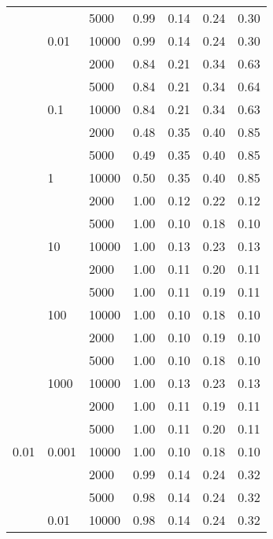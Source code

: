 \begin{tabular}{lllrrrr}
      &       & 5000 &       0.99 &       0.14 &       0.24 &       0.30 \\
      & 0.01 & 10000 &       0.99 &       0.14 &       0.24 &       0.30 \\
      &       & 2000 &       0.84 &       0.21 &       0.34 &       0.63 \\
      &       & 5000 &       0.84 &       0.21 &       0.34 &       0.64 \\
      & 0.1 & 10000 &       0.84 &       0.21 &       0.34 &       0.63 \\
      &       & 2000 &       0.48 &       0.35 &       0.40 &       0.85 \\
      &       & 5000 &       0.49 &       0.35 &       0.40 &       0.85 \\
      & 1 & 10000 &       0.50 &       0.35 &       0.40 &       0.85 \\
      &       & 2000 &       1.00 &       0.12 &       0.22 &       0.12 \\
      &       & 5000 &       1.00 &       0.10 &       0.18 &       0.10 \\
      & 10 & 10000 &       1.00 &       0.13 &       0.23 &       0.13 \\
      &       & 2000 &       1.00 &       0.11 &       0.20 &       0.11 \\
      &       & 5000 &       1.00 &       0.11 &       0.19 &       0.11 \\
      & 100 & 10000 &       1.00 &       0.10 &       0.18 &       0.10 \\
      &       & 2000 &       1.00 &       0.10 &       0.19 &       0.10 \\
      &       & 5000 &       1.00 &       0.10 &       0.18 &       0.10 \\
      & 1000 & 10000 &       1.00 &       0.13 &       0.23 &       0.13 \\
      &       & 2000 &       1.00 &       0.11 &       0.19 &       0.11 \\
      &       & 5000 &       1.00 &       0.11 &       0.20 &       0.11 \\
0.01 & 0.001 & 10000 &       1.00 &       0.10 &       0.18 &       0.10 \\
      &       & 2000 &       0.99 &       0.14 &       0.24 &       0.32 \\
      &       & 5000 &       0.98 &       0.14 &       0.24 &       0.32 \\
      & 0.01 & 10000 &       0.98 &       0.14 &       0.24 &       0.32 \\

\end{tabular}
